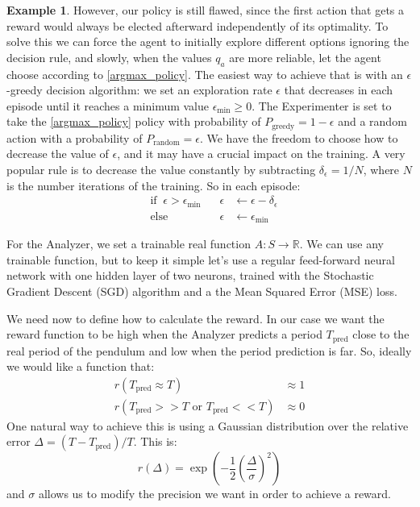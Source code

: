 \documentclass[11pt,a4paper,twoside]{report}
\newcommand{\+}{\textnormal{+} }
\theoremstyle{definition}
\newtheorem{myex}[mythm]{Example}
\numberwithin{equation}{chapter}
\begin{document}
\begin{myex}
However, our policy is still flawed, since the first action that gets a reward
would always be elected afterward independently of its optimality. To solve this
we can force the agent to initially explore different options ignoring the
decision rule, and slowly, when the values $q_a$ are more reliable, let the
agent choose according to \eqref{argmax_policy}. The easiest way to achieve that
is with an $\epsilon$-greedy decision algorithm: we set an exploration rate
$\epsilon$ that decreases in each episode until it reaches a minimum value
$\epsilon_\text{min}\geq 0$. The Experimenter is set to take the
\eqref{argmax_policy} policy with probability of $P_{\text{greedy}}=1-\epsilon$
and a random action with a probability of $P_{\text{random}}=\epsilon$. We have
the freedom to choose how to decrease the value of $\epsilon$, and it may have a
crucial impact on the training. A very popular rule is to decrease the value
constantly by subtracting $\delta_\epsilon = 1/N$, where $N$ is the number
iterations of the training. So in each episode:
\begin{align}
  &\text{if}\; \; \epsilon > \epsilon_\text{min} \;\;\; &\epsilon&\leftarrow\epsilon - \delta_\epsilon \\
  &\text{else} \; \;  &\epsilon &\leftarrow \epsilon_\text{min}
\end{align} 


For the Analyzer, we set a trainable real function $A: S \rightarrow
\mathbb{R}$. We can use any trainable function, but to keep it simple let's use
a regular feed-forward neural network with one hidden layer of two neurons,
trained with the Stochastic Gradient Descent (SGD) algorithm and a the Mean
Squared Error (MSE) loss.

We need now to define how to calculate the reward.  In our case we want the
reward function to be high when the Analyzer predicts a period $T_\text{pred}$
close to the real period of the pendulum and low when the period prediction is
far. So, ideally we would like a function that:
\begin{align}
       r(T_{\text{pred}} \approx T) &\approx 1\\
       r(T_{\text{pred}}>> T \text{ or } T_{\text{pred}} << T) & \approx 0
\end{align}
One natural way to achieve this is using a Gaussian distribution over the
relative error $\Delta=(T-T_{\text{pred}})/T$. This is:
\begin{equation}
   r(\Delta)=\exp\left(-\frac{1}{2}\left( \frac{\Delta}{\sigma} \right) ^2\right)
\end{equation}
and $\sigma$ allows us to modify the precision we want in order to achieve a 
reward.


\end{myex}
\end{document}

